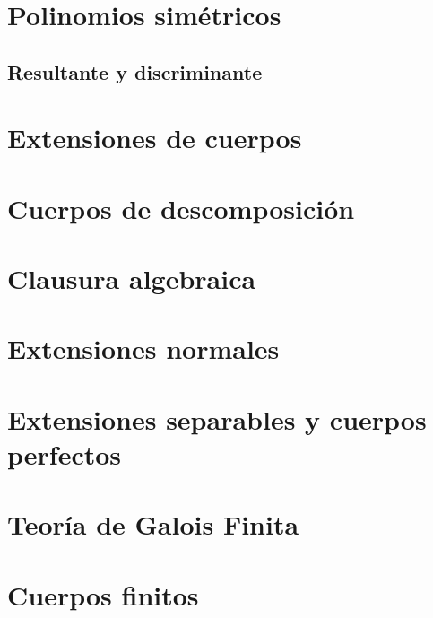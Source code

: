 \documentclass{article}
\theoremstyle{theorem-style}  %
\theoremstyle{definition-style}
\theoremstyle{example-style}
\begin{document}
\makeatletter\renewcommand{\ALG@name}{Algoritmo}

\maketitle



\newpage
\tableofcontents
\newpage

\section{Polinomios simétricos}


\subsection{Resultante y discriminante}

\pagebreak
\section{Extensiones de cuerpos}

\pagebreak
\section{Cuerpos de descomposición}

\pagebreak
\section{Clausura algebraica}

\pagebreak
\section{Extensiones normales}

\pagebreak
\section{Extensiones separables y cuerpos perfectos}

\pagebreak
\section{Teoría de Galois Finita}

\pagebreak
\section{Cuerpos finitos}

\pagebreak

\printbibliography
\end{document}
